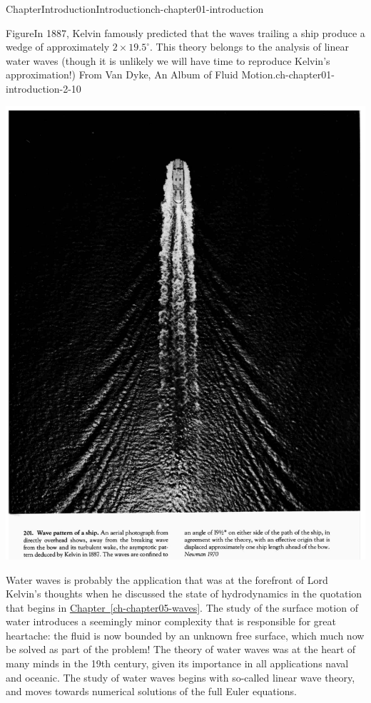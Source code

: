 \documentclass[oneside,10pt,]{book}
\newcommand{\xreffont}{\relax}
\numberwithin{equation}{section}
\begin{document}
\begin{chapterptx}{Chapter}{Introduction}{}{Introduction}{}{}{ch-chapter01-introduction}
\begin{introduction}{}
\begin{figureptx}{Figure}{In 1887, Kelvin famously predicted that the waves trailing a ship produce a wedge of approximately \(2 \times 19.5^\circ\). This theory belongs to the analysis of linear water waves (though it is unlikely we will have time to reproduce Kelvin's approximation!) From Van Dyke, An Album of Fluid Motion.}{ch-chapter01-introduction-2-10}{}%
\begin{image}{0.15}{0.7}{0.15}{}%
\includegraphics[width=\linewidth]{external/kelvinwave.png}
\end{image}%
\tcblower
\end{figureptx}%
Water waves is probably the application that was at the forefront of Lord Kelvin's thoughts when he discussed the state of hydrodynamics in the quotation that begins in \hyperref[ch-chapter05-waves]{Chapter~{\xreffont\ref{ch-chapter05-waves}}}. The study of the surface motion of water introduces a seemingly minor complexity that is responsible for great heartache: the fluid is now bounded by an unknown free surface, which much now be solved as part of the problem! The theory of water waves was at the heart of many minds in the 19th century, given its importance in all applications naval and oceanic. The study of water waves begins with so-called linear wave theory, and moves towards numerical solutions of the full Euler equations.%

\end{introduction}
\end{chapterptx}
\end{document}
